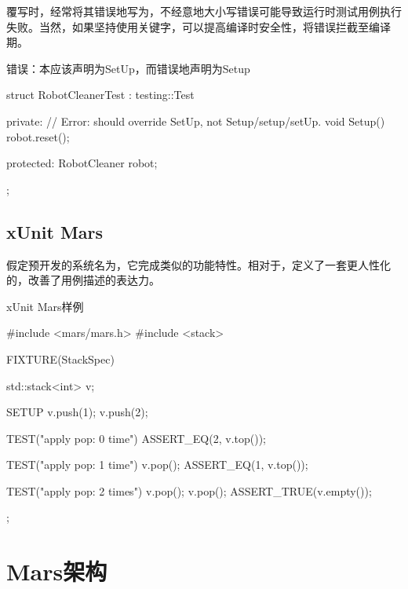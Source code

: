 \begin{content}
覆写时，经常将其错误地写为，不经意地大小写错误可能导致运行时测试用例执行失败。当然，如果坚持使用关键字，可以提高编译时安全性，将错误拦截至编译期。

\begin{nodiff}{错误：本应该声明为SetUp，而错误地声明为Setup}
 \begin{c++}
struct RobotCleanerTest : testing::Test {
private:
  // Error: should override SetUp, not Setup/setup/setUp.
  void Setup() {
    robot.reset();
  }
 
protected:
  RobotCleaner robot;
};
  \end{c++}
\end{nodiff}

\subsection{xUnit Mars}

假定预开发的系统名为，它完成类似的功能特性。相对于，定义了一套更人性化的，改善了用例描述的表达力。

\begin{enum}
\end{enum}

\begin{nodiff}{xUnit Mars样例}
 \begin{c++}
#include <mars/mars.h>
#include <stack>

FIXTURE(StackSpec) {
  std::stack<int> v;   

  SETUP {
    v.push(1);
    v.push(2);
  }

  TEST("apply pop: 0 time") {
    ASSERT_EQ(2, v.top());
  }

  TEST("apply pop: 1 time") {
    v.pop();
    ASSERT_EQ(1, v.top());
  }

  TEST("apply pop: 2 times") {
    v.pop();
    v.pop();
    ASSERT_TRUE(v.empty());
  }
}; 
 \end{c++}
\end{nodiff}

\end{content}

\section{Mars架构}
	
